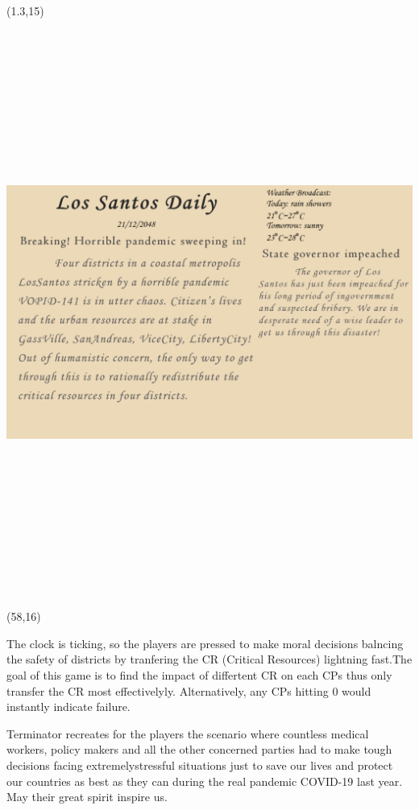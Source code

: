 \documentclass[hyperref={pdfpagelabels=false}]{beamer}
\begin{document}
\begin{frame}
\begin{textblock}{10}(1.3,15)
		\begin{blankbox}
			\centering
			\includegraphics[angle=8,height=525pt]{img/news.png}
		\end{blankbox}
	\end{textblock}




	\begin{textblock}{40}(58,16)
		\begin{blankbox}
\vspace {0.4cm}
The clock is ticking, so the players are pressed to make moral decisions balncing the safety of districts by tranfering the CR (Critical Resources) lightning fast.The goal of this game is to find the impact of differtent CR on each CPs thus only transfer the CR most effectivelyly. Alternatively, any CPs hitting 0 would instantly indicate failure.\vspace {0.4cm}

 Terminator recreates for the players the scenario where countless medical workers, policy makers and all the other concerned parties had to make tough decisions facing extremelystressful situations just to save our lives and protect our countries as best as they can during the real pandemic COVID-19 last year. May their great spirit inspire us.\vspace {0.4cm}
			

\end{blankbox}
\end{textblock}
\end{frame}
\end{document}
